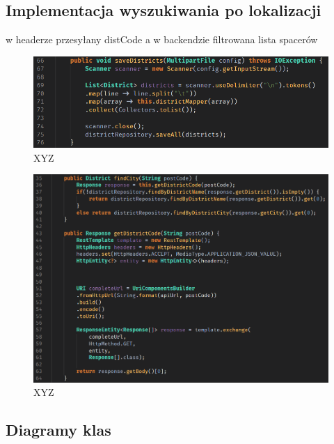 \subsection{Implementacja wyszukiwania po lokalizacji}
w headerze przesyłany distCode a w backendzie filtrowana lista spacerów
\begin{figure}[H]
  \centering
  \includegraphics[width=1\linewidth]{rysunki/save.PNG}
  \caption{XYZ}
  \label{fig:xyz}
\end{figure}
\begin{figure}[H]
  \centering
  \includegraphics[width=1\linewidth]{rysunki/get-dist.PNG}
  \caption{XYZ}
  \label{fig:xyz}
\end{figure}

\subsection{Diagramy klas}


